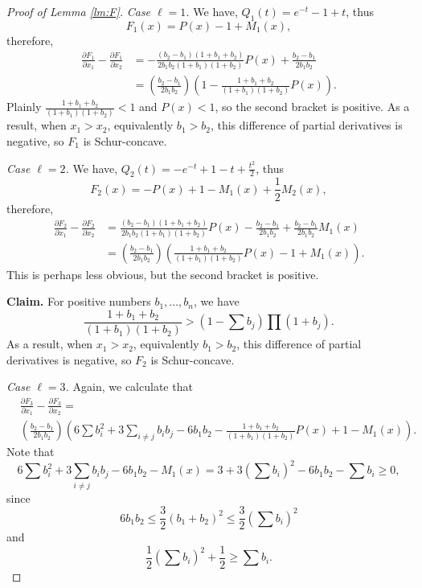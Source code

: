 \documentclass[10pt,a4paper]{amsart}
\begin{document}
\begin{proof}[Proof of Lemma \ref{lm:F}]
\emph{Case $\ell = 1$.}
We have, $Q_1(t) = e^{-t} -1 + t$, thus
\[
F_1(x) = P(x)-1 + M_1(x),
\]
therefore,
\begin{align*}
\frac{\partial F_1}{\partial x_1} - \frac{\partial F_1}{\partial x_2} &= -\frac{(b_2-b_1)(1+b_1+b_2)}{2b_1b_2(1+b_1)(1+b_2)}P(x) + \frac{b_2-b_1}{2b_1b_2} \\
&=\left(\frac{b_2-b_1}{2b_1b_2}\right)\left(1 - \frac{1+b_1+b_2}{(1+b_1)(1+b_2)}P(x)\right).
\end{align*}
Plainly $\frac{1+b_1+b_2}{(1+b_1)(1+b_2)} < 1$ and $P(x) < 1$, so the second bracket is positive.
As a result, when $x_1 > x_2$, equivalently $b_1 > b_2$, this difference of partial derivatives is negative, so $F_1$ is Schur-concave.


\emph{Case $\ell = 2$.}
We have, $Q_2(t) = -e^{-t} +1 - t + \frac{t^2}{2}$, thus
\[
F_2(x) = -P(x) + 1 - M_1(x) + \frac{1}{2}M_2(x),
\]
therefore,
\begin{align*}
\frac{\partial F_2}{\partial x_1} - \frac{\partial F_2}{\partial x_2} &= \frac{(b_2-b_1)(1+b_1+b_2)}{2b_1b_2(1+b_1)(1+b_2)}P(x) - \frac{b_2-b_1}{2b_1b_2} + \frac{b_2-b_1}{2b_1b_2}M_1(x)  \\
&=\left(\frac{b_2-b_1}{2b_1b_2}\right)\left(\frac{1+b_1+b_2}{(1+b_1)(1+b_2)}P(x)-1 + M_1(x)\right).
\end{align*}
This is perhaps less obvious, but the second bracket is positive.

\textbf{Claim.} For positive numbers $b_1, \dots, b_n$, we have
\[
\frac{1+b_1+b_2}{(1+b_1)(1+b_2)} > \left(1 - \sum b_j\right)\prod (1+b_j).
\]
As a result, when $x_1 > x_2$, equivalently $b_1 > b_2$, this difference of partial derivatives is negative, so $F_2$ is Schur-concave.

\emph{Case $\ell = 3$.} Again, we calculate that
\begin{align*}
	&\frac{\partial F_3}{\partial x_1} - \frac{\partial F_3}{\partial x_2}=\\ &\left(\frac{b_2-b_1}{2b_1b_2}\right)\left(6\sum b_i^2+3\sum_{i\neq j}b_ib_j-6b_1b_2-\frac{1+b_1+b_2}{(1+b_1)(1+b_2)}P(x)+1-M_1(x)\right).
\end{align*}
Note that $$6\sum b_i^2+3\sum_{i\neq j}b_ib_j-6b_1b_2-M_1(x)=3+3\left(\sum b_i\right)^2-6b_1b_2-\sum b_i\geq 0,$$
since $$6b_1b_2\leq\frac{3}{2}(b_1+b_2)^2\leq \frac{3}{2}(\sum b_i)^2$$ and 
$$\frac{1}{2}(\sum b_i)^2+\frac{1}{2}\geq\sum b_i.$$
\end{proof}
\end{document}
